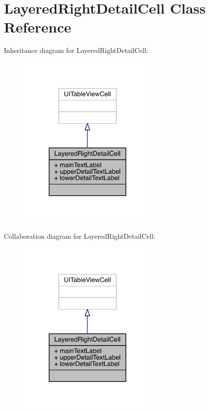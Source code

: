 \hypertarget{interface_layered_right_detail_cell}{\section{Layered\-Right\-Detail\-Cell Class Reference}
\label{interface_layered_right_detail_cell}
}


Inheritance diagram for Layered\-Right\-Detail\-Cell\-:\nopagebreak
\begin{figure}[H]
\begin{center}
\leavevmode
\includegraphics[width=198pt]{interface_layered_right_detail_cell__inherit__graph}
\end{center}
\end{figure}


Collaboration diagram for Layered\-Right\-Detail\-Cell\-:\nopagebreak
\begin{figure}[H]
\begin{center}
\leavevmode
\includegraphics[width=198pt]{interface_layered_right_detail_cell__coll__graph}
\end{center}
\end{figure}
